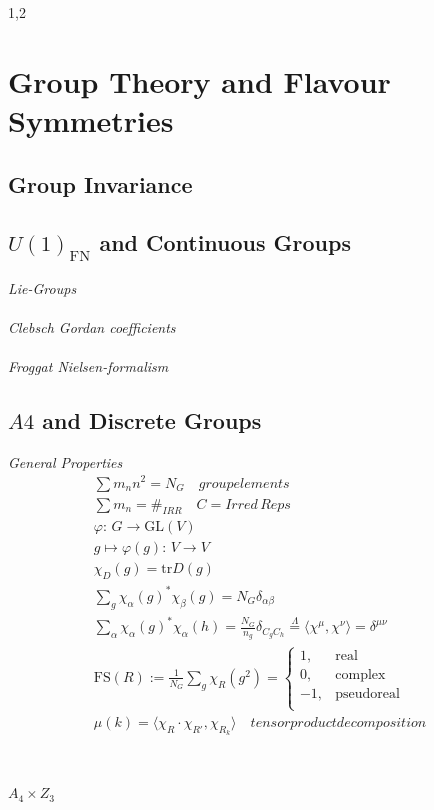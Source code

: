 \documentclass[11pt,a4paper,twoside]{article}
\numberwithin{equation}{section}
\begin{document}
\begin{spacing}{1,2}
\section{Group Theory and Flavour Symmetries}
\subsection{Group Invariance}
\subsection{$U(1)_\text{FN}$ and Continuous Groups}
\label{sec_FNGT}
 \textit{Lie-Groups}\\
\\ \textit{Clebsch Gordan coefficients} \\
\\ \textit{Froggat Nielsen-formalism}

\subsection{$A4$ and Discrete Groups}
\label{sec_A4GT}
\textit{General Properties}\\
 \begin{align}
  \sum m_n n^2 = N_G \quad groupelements\\
  \sum m_n = \#_{IRR} \quad C = Irred\,Reps\\
  \varphi:\, G\rightarrow \text{GL}(V)\\
  g\mapsto \varphi(g):\, V\rightarrow V\\
  \chi_D(g) = \text{tr}D(g)\\
  \sum_g \chi_\alpha(g)^*\chi_\beta(g) = N_G \delta_{\alpha\beta}\\
  \sum_\alpha \chi_\alpha(g)^*\chi_\alpha(h) = \frac{N_G}{n_g} \delta_{C_g C_h} \stackrel{\Lambda}{=} \langle \chi^\mu, \chi^\nu \rangle = \delta^{\mu\nu}\\
  \text{FS}(R) := \frac{1}{N_G} \sum_g \chi_R(g^2) =\begin{cases}
                                                     1, & \text{real}\\
                                                     0, & \text{complex}\\
                                                     -1, & \text{pseudoreal}\\
                                                    \end{cases}\\
  \mu(k) = \langle \chi_R \cdot \chi_{R'} , \chi_{R_k} \rangle \quad tensor product decomposition\\
 \end{align}
 \\ \\ \textit{$A_4\times Z_3$}\\


\end{spacing}
\end{document}
